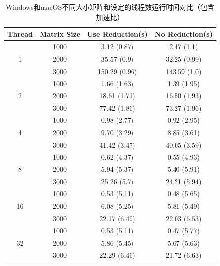 \documentclass{article}
\begin{document}
\begin{table}[H]
    \centering
    \label{tab:2}
    \begin{tabular}{cccc}
    \toprule
    \textbf{Thread} & \textbf{Matrix Size} & \textbf{Use Reduction(s)} & \textbf{No Reduction(s)} \\
    \midrule
    \multirow{3}{*}{1} & 1000 & 3.12 (0.87) & 2.47 (1.1) \\
    & 2000 & 35.57 (0.9) & 32.25 (0.99) \\
    & 3000 & 150.29 (0.96) & 143.59 (1.0) \\
    \midrule
    \multirow{3}{*}{2} & 1000 & 1.66 (1.63) & 1.39 (1.95) \\
    & 2000 & 18.61 (1.71) & 16.50 (1.93) \\
    & 3000 & 77.42 (1.86) & 73.27 (1.96) \\
    \midrule
    \multirow{3}{*}{4} & 1000 & 0.98 (2.77) & 0.92 (2.95) \\
    & 2000 & 9.70 (3.29) & 8.85 (3.61) \\
    & 3000 & 41.42 (3.47) & 40.05 (3.59) \\
    \midrule
    \multirow{3}{*}{8} & 1000 & 0.62 (4.37) & 0.55 (4.93) \\
    & 2000 & 5.94 (5.37) & 5.40 (5.91) \\
    & 3000 & 25.26 (5.7) & 24.21 (5.94) \\
    \midrule
    \multirow{3}{*}{16} & 1000 & 0.53 (5.11) & 0.48 (5.65) \\
    & 2000 & 6.08 (5.25) & 5.81 (5.49) \\
    & 3000 & 22.17 (6.49) & 22.03 (6.53) \\
    \midrule
    \multirow{3}{*}{32} & 1000 & 0.53 (5.11) & 0.47 (5.77) \\
    & 2000 & 5.86 (5.45) & 5.67 (5.63) \\
    & 3000 & 22.29 (6.46) & 21.72 (6.63) \\
    \bottomrule
    \end{tabular}
    \caption{Windows和macOS不同大小矩阵和设定的线程数运行时间对比（包含加速比）}
\end{table}
\end{document}
